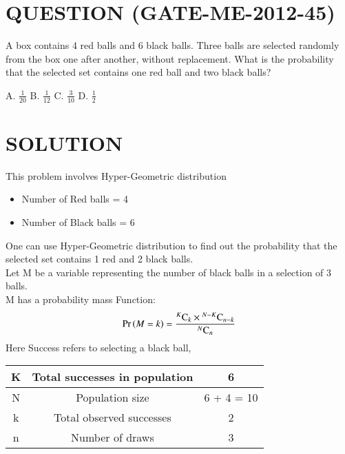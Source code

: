 \documentclass[journal,12pt,twocolumn]{IEEEtran}
\begin{document}
\section*{QUESTION (GATE-ME-2012-45)}
A box contains 4 red balls and 6 black balls. Three balls are selected randomly from the box one after another, 
without replacement. What is the probability that the selected set contains one red ball and two black balls?
\begin{center}
    A. $\displaystyle{\frac{1}{20}}$ \hspace{0.5cm}B. $\displaystyle{\frac{1}{12}}$ \hspace{0.5cm}C. $\displaystyle{\frac{3}{10}}$ \hspace{0.5cm}D. $\displaystyle{\frac{1}{2}}$
\end{center}
\section*{SOLUTION}
This problem involves Hyper-Geometric distribution
\bigskip
\begin{itemize}
    \item Number of Red balls = 4
    \item Number of Black balls = 6
\end{itemize}
\bigskip
One can use Hyper-Geometric distribution to find out the probability that the selected set contains 1 red and 2 black balls.\\
Let M be a variable representing the number of black balls in a selection of 3 balls.\\
M has a probability mass Function:
\begin{equation}
    \Pr\left(M = k\right) = \frac{{}^{K}\mathrm{C}_{k} \times {}^{N-K}\mathrm{C}_{n-k}}{{}^{N}\mathrm{C}_{n}}
\end{equation}
Here Success refers to selecting a black ball,
\begin{table}[H]
    \begin{center}
        \resizebox{!}{!}
        {
            \begin{tabular}{|c|c|c|}
                \hline
                K & Total successes in population & 6\\
                \hline
                N & Population size & 6 + 4 = 10\\
                \hline
                k & Total observed successes & 2\\
                \hline
                n & Number of draws & 3\\
                \hline
            \end{tabular}
        }
    \end{center}
\end{table}
\end{document}
